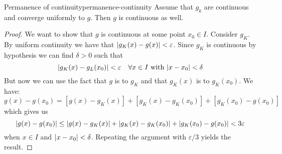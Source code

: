 \documentclass[12pt]{extarticle}
\begin{document}
\begin{theorem}{Permanence of continuity}{permanence-continuity}
	Assume that $g_k$ are continuous and converge uniformly to $g$. Then $g$ is continuous as well.
\end{theorem}
\begin{proof}
	We want to show that $g$ is continuous at some point $x_0 \in I$.
	Consider $g_K$. By uniform continuity we have that $\abs{g_K(x) - g(x)} < \varepsilon$.
	Since $g_K$ is continuous by hypothesis we can find $\delta > 0$ such that
	\begin{equation}
		\abs{g_K(x) - g_L(x_0)} < \varepsilon \quad \forall x \in I \text{ with } \abs{x - x_0} < \delta
	\end{equation}
	But now we can use the fact that $g$ is  to $g_K$ and that $g_K(x)$ is  to $g_K(x_0)$.
	We have:
	\begin{equation}
		g(x) - g(x_0) = [g(x) -g_K(x)] + [g_K(x) - g_K(x_0)] + [g_K(x_0) - g(x_0)]
	\end{equation}
	which gives us
	\begin{equation}
		\abs{g(x) - g(x_0)} \leq \abs{g(x) -g_K(x)} + \abs{g_K(x) - g_K(x_0)} +\abs{g_K(x_0) - g(x_0)} < 3 \varepsilon
	\end{equation}
	when $x \in I$ and $\abs{x - x_0} < \delta$.
	Repeating the argument with $\varepsilon/3$ yields the result.
\end{proof}
\end{document}
